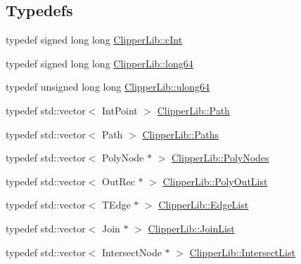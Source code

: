 \subsection*{Typedefs}
\begin{DoxyCompactItemize}
\item 
typedef signed long long \mbox{\hyperlink{namespace_clipper_lib_a7156730a24951629192d4831334bafaa}{Clipper\+Lib\+::c\+Int}}
\item 
typedef signed long long \mbox{\hyperlink{namespace_clipper_lib_a7fd564bf34d174b6c96e07d01e5e7a0a}{Clipper\+Lib\+::long64}}
\item 
typedef unsigned long long \mbox{\hyperlink{namespace_clipper_lib_a031fec5e97eb7e08708f1cafa53a232d}{Clipper\+Lib\+::ulong64}}
\item 
typedef std\+::vector$<$ Int\+Point $>$ \mbox{\hyperlink{namespace_clipper_lib_af39c8fe00f278f18cc8142fef41242da}{Clipper\+Lib\+::\+Path}}
\item 
typedef std\+::vector$<$ Path $>$ \mbox{\hyperlink{namespace_clipper_lib_a4bab1d9e10805fa6f1fd3b78c56efcfe}{Clipper\+Lib\+::\+Paths}}
\item 
typedef std\+::vector$<$ Poly\+Node $\ast$ $>$ \mbox{\hyperlink{namespace_clipper_lib_ac9381bbff6b966df41b78667385b9c1e}{Clipper\+Lib\+::\+Poly\+Nodes}}
\item 
typedef std\+::vector$<$ Out\+Rec $\ast$ $>$ \mbox{\hyperlink{namespace_clipper_lib_a955330d96f532e139adb1e52a82fcd43}{Clipper\+Lib\+::\+Poly\+Out\+List}}
\item 
typedef std\+::vector$<$ T\+Edge $\ast$ $>$ \mbox{\hyperlink{namespace_clipper_lib_a86ece3ad074061d6b3d18819b1fa4ed7}{Clipper\+Lib\+::\+Edge\+List}}
\item 
typedef std\+::vector$<$ Join $\ast$ $>$ \mbox{\hyperlink{namespace_clipper_lib_a7e09990d21008cefa4e28e9056c654c4}{Clipper\+Lib\+::\+Join\+List}}
\item 
typedef std\+::vector$<$ Intersect\+Node $\ast$ $>$ \mbox{\hyperlink{namespace_clipper_lib_aa619079161cda3de8197456767f54396}{Clipper\+Lib\+::\+Intersect\+List}}
\end{DoxyCompactItemize}
